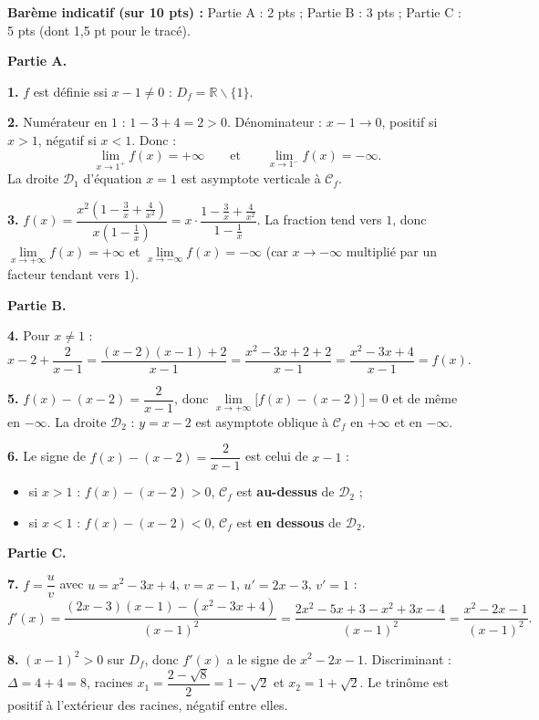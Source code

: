 \documentclass[11pt]{article}
\newcommand{\cle}[1]{{\popxbold\color{popdark}#1}}
\def\setminus{\mathbin{\backslash}}\let\smallsetminus\setminus
\begin{document}
\begin{corrige}
\textbf{Barème indicatif (sur 10 pts) :} Partie A : 2 pts ; Partie B : 3 pts ; Partie C : 5 pts (dont 1,5 pt pour le tracé).

\textbf{Partie A.}

\textbf{1.} $f$ est définie ssi $x-1\neq 0$ : $D_f=\mathbb{R}\setminus\{1\}$.

\textbf{2.} Numérateur en $1$ : $1-3+4=2>0$. Dénominateur : $x-1\to 0$, positif si $x>1$, négatif si $x<1$. Donc :
\[ \lim_{x\to 1^+}f(x)=+\infty \qquad \text{et} \qquad \lim_{x\to 1^-}f(x)=-\infty. \]
La droite $\mathcal{D}_1$ d'équation $\boxed{x=1}$ est \cle{asymptote verticale} à $\mathcal{C}_f$.

\textbf{3.} $f(x)=\dfrac{x^2\left(1-\frac3x+\frac{4}{x^2}\right)}{x\left(1-\frac1x\right)}=x\cdot\dfrac{1-\frac3x+\frac{4}{x^2}}{1-\frac1x}$. La fraction tend vers $1$, donc $\lim\limits_{x\to+\infty}f(x)=+\infty$ et $\lim\limits_{x\to-\infty}f(x)=-\infty$ (car $x\to-\infty$ multiplié par un facteur tendant vers $1$).

\textbf{Partie B.}

\textbf{4.} Pour $x\neq 1$ :
\[ x-2+\frac{2}{x-1}=\frac{(x-2)(x-1)+2}{x-1}=\frac{x^2-3x+2+2}{x-1}=\frac{x^2-3x+4}{x-1}=f(x). \]

\textbf{5.} $f(x)-(x-2)=\dfrac{2}{x-1}$, donc $\lim\limits_{x\to+\infty}\bigl[f(x)-(x-2)\bigr]=0$ et de même en $-\infty$. La droite $\mathcal{D}_2$ : $\boxed{y=x-2}$ est \cle{asymptote oblique} à $\mathcal{C}_f$ en $+\infty$ et en $-\infty$.

\textbf{6.} Le signe de $f(x)-(x-2)=\dfrac{2}{x-1}$ est celui de $x-1$ :
\begin{itemize}
\item si $x>1$ : $f(x)-(x-2)>0$, $\mathcal{C}_f$ est \textbf{au-dessus} de $\mathcal{D}_2$ ;
\item si $x<1$ : $f(x)-(x-2)<0$, $\mathcal{C}_f$ est \textbf{en dessous} de $\mathcal{D}_2$.
\end{itemize}

\textbf{Partie C.}

\textbf{7.} $f=\dfrac{u}{v}$ avec $u=x^2-3x+4$, $v=x-1$, $u'=2x-3$, $v'=1$ :
\[ f'(x)=\frac{(2x-3)(x-1)-(x^2-3x+4)}{(x-1)^2}=\frac{2x^2-5x+3-x^2+3x-4}{(x-1)^2}=\frac{x^2-2x-1}{(x-1)^2}. \]

\textbf{8.} $(x-1)^2>0$ sur $D_f$, donc $f'(x)$ a le signe de $x^2-2x-1$. Discriminant : $\Delta=4+4=8$, racines $x_1=\dfrac{2-\sqrt{8}}{2}=1-\sqrt{2}$ et $x_2=1+\sqrt{2}$. Le trinôme est positif à l'extérieur des racines, négatif entre elles.


\end{corrige}
\end{document}
